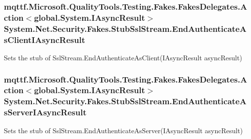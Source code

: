 \hypertarget{class_system_1_1_net_1_1_security_1_1_fakes_1_1_stub_ssl_stream_a4ecb4c84310b5fae70065f9f807f60ce}{
\subsubsection[{End\-Authenticate\-As\-Client\-I\-Async\-Result}]{\setlength{\rightskip}{0pt plus 5cm}mqttf.\-Microsoft.\-Quality\-Tools.\-Testing.\-Fakes.\-Fakes\-Delegates.\-Action$<$global.\-System.\-I\-Async\-Result$>$ System.\-Net.\-Security.\-Fakes.\-Stub\-Ssl\-Stream.\-End\-Authenticate\-As\-Client\-I\-Async\-Result}}\label{class_system_1_1_net_1_1_security_1_1_fakes_1_1_stub_ssl_stream_a4ecb4c84310b5fae70065f9f807f60ce}


Sets the stub of Ssl\-Stream.\-End\-Authenticate\-As\-Client(\-I\-Async\-Result async\-Result)

\hypertarget{class_system_1_1_net_1_1_security_1_1_fakes_1_1_stub_ssl_stream_a5e33c88c059b18565982e15d6171a5b2}{
\subsubsection[{End\-Authenticate\-As\-Server\-I\-Async\-Result}]{\setlength{\rightskip}{0pt plus 5cm}mqttf.\-Microsoft.\-Quality\-Tools.\-Testing.\-Fakes.\-Fakes\-Delegates.\-Action$<$global.\-System.\-I\-Async\-Result$>$ System.\-Net.\-Security.\-Fakes.\-Stub\-Ssl\-Stream.\-End\-Authenticate\-As\-Server\-I\-Async\-Result}}\label{class_system_1_1_net_1_1_security_1_1_fakes_1_1_stub_ssl_stream_a5e33c88c059b18565982e15d6171a5b2}


Sets the stub of Ssl\-Stream.\-End\-Authenticate\-As\-Server(\-I\-Async\-Result async\-Result)


